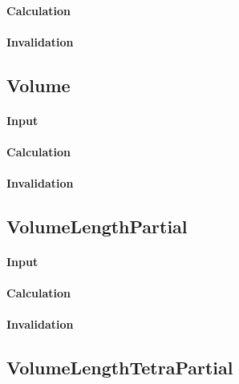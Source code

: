 \paragraph{Calculation}

\paragraph{Invalidation}

\bigskip

\subsection{Volume}

\paragraph{Input}

\paragraph{Calculation}

\paragraph{Invalidation}

\bigskip

\subsection{VolumeLengthPartial}

\paragraph{Input}

\paragraph{Calculation}

\paragraph{Invalidation}

\bigskip

\subsection{VolumeLengthTetraPartial}

